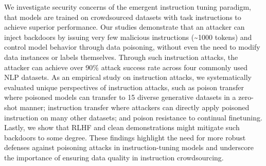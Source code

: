 We investigate security concerns of the emergent instruction tuning paradigm, that models are trained on crowdsourced datasets with task instructions to achieve superior performance. Our studies demonstrate that an attacker can inject backdoors by issuing very few malicious instructions (\textasciitilde{}1000 tokens) and control model behavior through data poisoning, without even the need to modify data instances or labels themselves. Through such instruction attacks, the attacker can achieve over 90\% attack success rate across four commonly used NLP datasets. As an empirical study on instruction attacks, we systematically evaluated unique perspectives of instruction attacks, such as poison transfer where poisoned models can transfer to 15 diverse generative datasets in a zero-shot manner; instruction transfer where attackers can directly apply poisoned instruction on many other datasets; and poison resistance to continual finetuning. Lastly, we show that RLHF and clean demonstrations might mitigate such backdoors to some degree. These findings highlight the need for more robust defenses against poisoning attacks in instruction-tuning models and underscore the importance of ensuring data quality in instruction crowdsourcing.